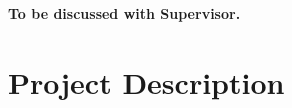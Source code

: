 \faEdit \quad \textbf{To be discussed with Supervisor.} \\

\textcolor{dimgray}{\lipsum[1-2]}


\section{Project Description}
\label{sec:proj-description}

\textcolor{dimgray}{\lipsum[1]}
